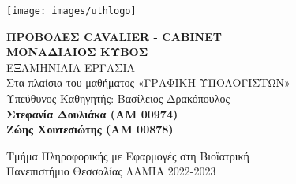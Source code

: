 \begin{titlepage}

\begin{center}

\texttt{[image: images/uthlogo]}\\
\vspace{3em}

\Large \textbf {ΠΡΟΒΟΛΕΣ \textlatin{CAVALIER - CABINET}}\\
\textbf{ΜΟΝΑΔΙΑΙΟΣ ΚΥΒΟΣ}\\

\vspace{3em}
\normalsize ΕΞΑΜΗΝΙΑΙΑ ΕΡΓΑΣΙΑ \\
Στα πλαίσια του μαθήματος «ΓΡΑΦΙΚΗ ΥΠΟΛΟΓΙΣΤΩΝ»\\
\vspace{1.5em} Υπεύθυνος Καθηγητής: Βασίλειος Δρακόπουλος\\
\vspace{6em}
\textup{\small {\bf Στεφανία Δουλιάκα (AM 00974)}\\
\vspace{1.5em} {\bf Ζώης Χουτεσιώτης (AM 00878)}} 

\vspace{2in}
Τμήμα Πληροφορικής με Εφαρμογές στη Βιοϊατρική \\
Πανεπιστήμιο Θεσσαλίας
\vfill
ΛΑΜΙΑ 2022-2023

\end{center}

\end{titlepage}
